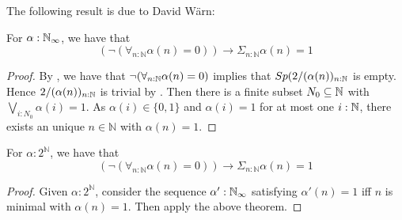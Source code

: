 The following result is due to David W\"arn:
\begin{theorem}\label{MarkovPrinciple}
  For $\alpha:\mathbb{N}_{\infty}$, we have that 
  \begin{equation}
    (\neg (\forall_{n:\mathbb N} \alpha (n)= 0)) \to \Sigma_{n:\mathbb N} \alpha (n)= 1
  \end{equation}
\end{theorem}
\begin{proof}
  By , we have that $\neg(\forall_{n:\mathbb{N}} \alpha(n) = 0)$ implies that 
  $Sp(2/(\alpha(n))_{n:\mathbb{N}}$ is empty. 
  Hence $2/(\alpha(n))_{n:\mathbb{N}}$ is trivial by . 
  Then there is a finite subset $N_0\subseteq \mathbb{N}$ with $\bigvee_{i:N_0} \alpha(i) = 1$. 
  As $\alpha(i) \in \{0,1\}$ and $\alpha(i) = 1$ for at most one $i:\mathbb{N}$, 
  there exists an unique $n\in\mathbb N$ with $\alpha(n) = 1$. 
\end{proof}

\begin{corollary}
  For $\alpha:2^\mathbb N$, we have that 
  \begin{equation}
    (\neg (\forall_{n:\mathbb N} \alpha (n)= 0)) \to \Sigma_{n:\mathbb N} \alpha (n)= 1
  \end{equation}
\end{corollary}
\begin{proof}
  Given $\alpha:2^\mathbb N$, consider the sequence $\alpha':\mathbb{N}_{\infty}$ satisfying $\alpha'(n) = 1$ iff 
  $n$ is minimal with $\alpha(n) = 1$. Then apply the above theorem.
\end{proof}

